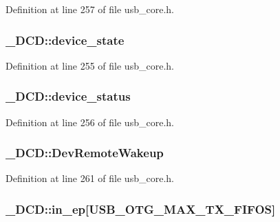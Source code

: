 Definition at line 257 of file usb\-\_\-core.\-h.

\hypertarget{struct___d_c_d_a3b318cb09f70b15aaea0aaa17c61e943}{
\subsubsection[{device\-\_\-state}]{ \-\_\-\-D\-C\-D\-::device\-\_\-state}}\label{struct___d_c_d_a3b318cb09f70b15aaea0aaa17c61e943}


Definition at line 255 of file usb\-\_\-core.\-h.

\hypertarget{struct___d_c_d_a0a6de2a3b497713b014ec306a3fc5e92}{
\subsubsection[{device\-\_\-status}]{ \-\_\-\-D\-C\-D\-::device\-\_\-status}}\label{struct___d_c_d_a0a6de2a3b497713b014ec306a3fc5e92}


Definition at line 256 of file usb\-\_\-core.\-h.

\hypertarget{struct___d_c_d_af37628bba9e86a2ccc12b0c377147150}{
\subsubsection[{Dev\-Remote\-Wakeup}]{ \-\_\-\-D\-C\-D\-::\-Dev\-Remote\-Wakeup}}\label{struct___d_c_d_af37628bba9e86a2ccc12b0c377147150}


Definition at line 261 of file usb\-\_\-core.\-h.

\hypertarget{struct___d_c_d_aca1551bdcee60a9fae805f0e7365cc7a}{
\subsubsection[{in\-\_\-ep}]{ \-\_\-\-D\-C\-D\-::in\-\_\-ep\mbox{[}U\-S\-B\-\_\-\-O\-T\-G\-\_\-\-M\-A\-X\-\_\-\-T\-X\-\_\-\-F\-I\-F\-O\-S\mbox{]}}}\label{struct___d_c_d_aca1551bdcee60a9fae805f0e7365cc7a}


